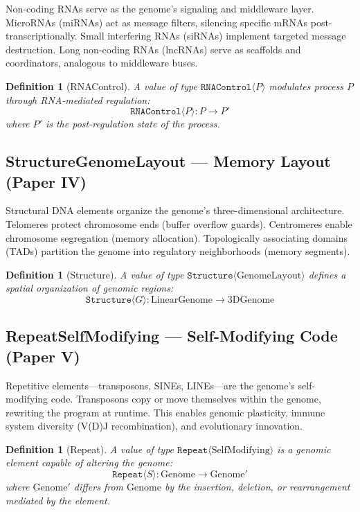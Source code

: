 \documentclass[12pt,a4paper]{article}
\newtheorem{definition}[theorem]{Definition}
\newcommand{\ty}[1]{\texttt{#1}}
\begin{document}
Non-coding RNAs serve as the genome's signaling and middleware layer. MicroRNAs (miRNAs) act as message filters, silencing specific mRNAs post-transcriptionally. Small interfering RNAs (siRNAs) implement targeted message destruction. Long non-coding RNAs (lncRNAs) serve as scaffolds and coordinators, analogous to middleware buses.

\begin{definition}[RNAControl]
A value of type $\ty{RNAControl}\langle P \rangle$ modulates process $P$ through RNA-mediated regulation:
\[
\ty{RNAControl}\langle P \rangle : P \to P'
\]
where $P'$ is the post-regulation state of the process.
\end{definition}

\subsection{Structure\textlangle GenomeLayout\textrangle{} --- Memory Layout (Paper IV)}

Structural DNA elements organize the genome's three-dimensional architecture. Telomeres protect chromosome ends (buffer overflow guards). Centromeres enable chromosome segregation (memory allocation). Topologically associating domains (TADs) partition the genome into regulatory neighborhoods (memory segments).

\begin{definition}[Structure]
A value of type $\ty{Structure}\langle \text{GenomeLayout} \rangle$ defines a spatial organization of genomic regions:
\[
\ty{Structure}\langle G \rangle : \text{LinearGenome} \to \text{3DGenome}
\]
\end{definition}

\subsection{Repeat\textlangle SelfModifying\textrangle{} --- Self-Modifying Code (Paper V)}

Repetitive elements---transposons, SINEs, LINEs---are the genome's self-modifying code. Transposons copy or move themselves within the genome, rewriting the program at runtime. This enables genomic plasticity, immune system diversity (V(D)J recombination), and evolutionary innovation.

\begin{definition}[Repeat]
A value of type $\ty{Repeat}\langle \text{SelfModifying} \rangle$ is a genomic element capable of altering the genome:
\[
\ty{Repeat}\langle S \rangle : \text{Genome} \to \text{Genome}'
\]
where $\text{Genome}'$ differs from $\text{Genome}$ by the insertion, deletion, or rearrangement mediated by the element.
\end{definition}
\end{document}
